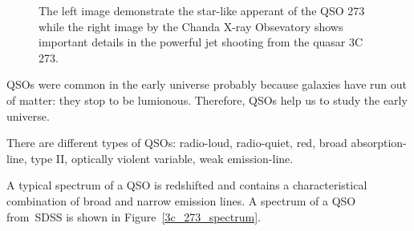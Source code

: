 \begin{figure}
\begin{center}
\quad
{}
\end{center}
\caption[Image and jet of the quasar 3C 273]{
	The left image demonstrate the star-like apperant of the QSO 273
	while the right image by the Chanda X-ray Obsevatory shows important details in the powerful jet shooting from the quasar 3C 273.
}
\label{3c_273}
\end{figure}

QSOs were common in the early universe probably because galaxies have run out of matter: they stop to be lumionous.
Therefore, QSOs help us to study the early universe.

There are different types of QSOs: radio-loud, radio-quiet, red, broad absorption-line, type II, optically violent variable, weak emission-line.

A typical spectrum of a QSO is redshifted and
contains a characteristical combination of broad and narrow emission lines.
A spectrum of a QSO from~SDSS is shown in Figure~\ref{3c_273_spectrum}.

